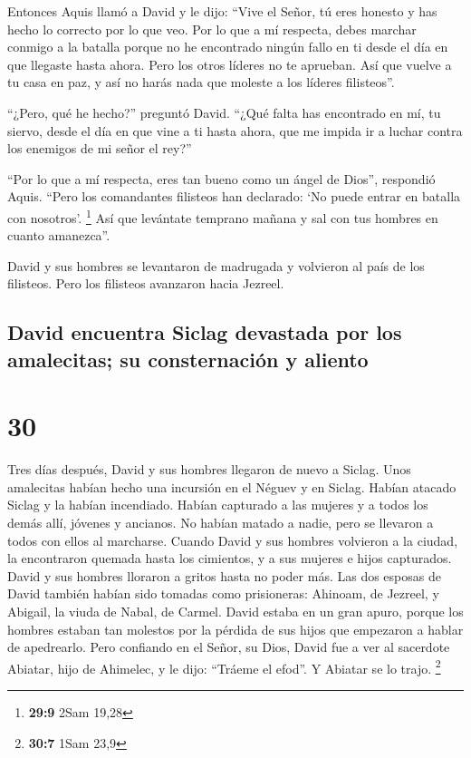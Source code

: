  Entonces Aquis llamó a David y le dijo: ``Vive el Señor,
tú eres honesto y has hecho lo correcto por lo que veo. Por lo que a mí
respecta, debes marchar conmigo a la batalla porque no he encontrado
ningún fallo en ti desde el día en que llegaste hasta ahora. Pero los
otros líderes no te aprueban.  Así que vuelve a tu casa en
paz, y así no harás nada que moleste a los líderes filisteos''.

 ``¿Pero, qué he hecho?'' preguntó David. ``¿Qué falta has
encontrado en mí, tu siervo, desde el día en que vine a ti hasta ahora,
que me impida ir a luchar contra los enemigos de mi señor el rey?''

 ``Por lo que a mí respecta, eres tan bueno como un ángel
de Dios'', respondió Aquis. ``Pero los comandantes filisteos han
declarado: `No puede entrar en batalla con nosotros'. \footnote{\textbf{29:9}
  2Sam 19,28}  Así que levántate temprano mañana y sal
con tus hombres en cuanto amanezca''.

 David y sus hombres se levantaron de madrugada y
volvieron al país de los filisteos. Pero los filisteos avanzaron hacia
Jezreel.

\hypertarget{david-encuentra-siclag-devastada-por-los-amalecitas-su-consternaciuxf3n-y-aliento}{%
\subsection{David encuentra Siclag devastada por los amalecitas; su
consternación y
aliento}\label{david-encuentra-siclag-devastada-por-los-amalecitas-su-consternaciuxf3n-y-aliento}}

\hypertarget{section-29}{%
\section{30}\label{section-29}}

 Tres días después, David y sus hombres llegaron de nuevo
a Siclag. Unos amalecitas habían hecho una incursión en el Néguev y en
Siclag. Habían atacado Siclag y la habían incendiado. 
Habían capturado a las mujeres y a todos los demás allí, jóvenes y
ancianos. No habían matado a nadie, pero se llevaron a todos con ellos
al marcharse.  Cuando David y sus hombres volvieron a la
ciudad, la encontraron quemada hasta los cimientos, y a sus mujeres e
hijos capturados.  David y sus hombres lloraron a gritos
hasta no poder más.  Las dos esposas de David también
habían sido tomadas como prisioneras: Ahinoam, de Jezreel, y Abigail, la
viuda de Nabal, de Carmel.  David estaba en un gran apuro,
porque los hombres estaban tan molestos por la pérdida de sus hijos que
empezaron a hablar de apedrearlo. Pero confiando en el Señor, su Dios,
 David fue a ver al sacerdote Abiatar, hijo de Ahimelec, y
le dijo: ``Tráeme el efod''. Y Abiatar se lo trajo. \footnote{\textbf{30:7}
  1Sam 23,9}

